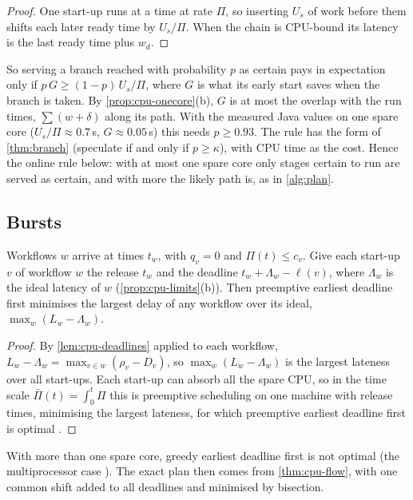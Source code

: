 \begin{proof}
One start-up runs at a time at rate $\Pi$, so inserting $U_s$ of work before them shifts each later
ready time by $U_s / \Pi$. When the chain is CPU-bound its latency is the last ready time plus
$w_d$.
\end{proof}

So serving a branch reached with probability $p$ as certain pays in expectation only if
$p\, G \ge (1 - p)\, U_s / \Pi$, where $G$ is what its early start saves when the branch is taken.
By \cref{prop:cpu-onecore}(b), $G$ is at most the overlap with the run times, $\sum (w + \delta)$
along its path. With the measured Java values on one spare core ($U_s / \Pi \approx 0.7$\,s,
$G \approx 0.05$\,s) this needs $p \ge 0.93$. The rule has the form of \cref{thm:branch}
(speculate if and only if $p \ge \kappa$), with CPU time as the cost. Hence the online rule
below: with at most one spare core only stages certain to run are served as certain, and with
more the likely path is, as in \cref{alg:plan}.

\subsection{Bursts}

\begin{proposition}
\label{prop:cpu-burst}
Workflows $w$ arrive at times $t_w$, with $q_v = 0$ and $\Pi(t) \le c_v$. Give each start-up $v$ of
workflow $w$ the release $t_w$ and the deadline $t_w + \Lambda_w - \ell(v)$, where $\Lambda_w$ is
the ideal latency of $w$ (\cref{prop:cpu-limits}(b)). Then preemptive earliest deadline first
minimises the largest delay of any workflow over its ideal, $\max_w (L_w - \Lambda_w)$.
\end{proposition}

\begin{proof}
By \cref{lem:cpu-deadlines} applied to each workflow,
$L_w - \Lambda_w = \max_{v \in w} (\rho_v - D_v)$, so $\max_w (L_w - \Lambda_w)$ is the largest
lateness over all start-ups. Each start-up can absorb all the spare CPU, so in the time scale
$\bar\Pi(t) = \int_0^t \Pi$ this is preemptive scheduling on one machine with release times, minimising
the largest lateness, for which preemptive earliest deadline first is optimal \cite{horn1974}.
\end{proof}

With more than one spare core, greedy earliest deadline first is not optimal (the
multiprocessor case \cite{dhall1978}). The exact plan then comes from \cref{thm:cpu-flow}, with
one common shift added to all deadlines and minimised by bisection.

